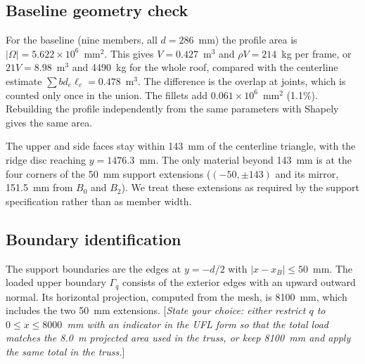 \subsection{Baseline geometry check}
For the baseline (nine members, all $d=286$~mm) the profile area is
$|\Omega|=5.622\times10^{6}$~mm$^2$. This gives $V=0.427$~m$^3$ and
$\rho V=214$~kg per frame, or $21V=8.98$~m$^3$ and 4490~kg for the
whole roof, compared with the centerline estimate
$\sum b d_e \ell_e=0.478$~m$^3$. The difference is the overlap at
joints, which is counted only once in the union. The fillets add
$0.061\times10^{6}$~mm$^2$ (1.1\%). Rebuilding the profile independently
from the same parameters with Shapely gives the same area.

The upper and side faces stay within 143~mm of the centerline triangle,
with the ridge disc reaching $y=1476.3$~mm. The only material beyond
143~mm is at the four corners of the 50~mm support extensions
($(-50,\pm143)$ and its mirror, 151.5~mm from $B_0$ and $B_2$). We treat
these extensions as required by the support specification rather than
as member width.

\subsection{Boundary identification}
The support boundaries are the edges at $y=-d/2$ with
$|x-x_{B}|\leq50$~mm. The loaded upper boundary $\Gamma_q$ consists of
the exterior edges with an upward outward normal. Its horizontal
projection, computed from the mesh, is 8100~mm, which includes the two
50~mm extensions. [\emph{State your choice: either restrict $q$ to
$0\leq x\leq8000$~mm with an indicator in the UFL form so that the total
load matches the 8.0~m projected area used in the truss, or keep
8100~mm and apply the same total in the truss.}]
